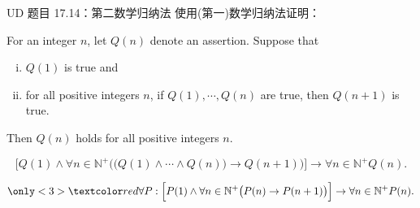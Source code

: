 
\begin{frame}{}
  \begin{exampleblock}{UD 题目 17.14：第二数学归纳法}
    使用(第一)数学归纳法证明：
    \begin{theorem}
      For an integer $n$, let $Q(n)$ denote an assertion. Suppose that
      \begin{enumerate}[(i)]
	\item $Q(1)$ is true and
	\item for all positive integers $n$, if $Q(1), \cdots, Q(n)$ are true,
	  then $Q(n+1)$ is true.
      \end{enumerate}
      Then $Q(n)$ holds for all positive integers $n$.
    \end{theorem}
  \end{exampleblock}
\end{frame}

\begin{frame}{}
  \begin{theorem}[第二数学归纳法]
    \[
      \Big[ Q(1) \land \forall n \in \mathbb{N}^{+} \Big(\big(Q(1) \land \cdots \land Q(n)\big) \to Q(n+1) \Big) \Big] 
	\to \forall n \in \mathbb{N}^{+} Q(n).
    \]
  \end{theorem}

  \pause
  \vspace{0.50cm}
  \begin{theorem}[(第一) 数学归纳法]
    \[
      \only<3>{\red{\forall P:}} \; \Big[ P(1) \land \forall n \in \mathbb{N}^{+} \big(P(n) \to P(n+1) \big) \Big]
	\to \forall n \in \mathbb{N}^{+} P(n).
    \]
  \end{theorem}

  \vspace{0.50cm}

\end{frame}

